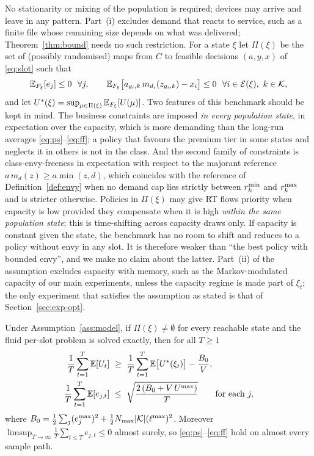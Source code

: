 No stationarity or mixing of the population is required; devices may arrive and leave in any pattern.
Part~(i) excludes demand that reacts to service, such as a finite file whose remaining size depends on what was delivered; Theorem~\ref{thm:bound} needs no such restriction.
For a state $\xi$ let $\Pi(\xi)$ be the set of (possibly randomised) maps from $C$ to feasible decisions $(a,y,x)$ of \eqref{eq:slot} such that
\begin{equation}\label{eq:bench}
\mathbb{E}_{F_\xi}[e_j]\le0\ \ \forall j,\qquad
\mathbb{E}_{F_\xi}\big[a_{g_i,k}\,m_{d_i}(z_{g_i,k})-x_i\big]\le0\ \ \forall i\in\mathcal{E}(\xi),\ k\in\mathcal{K},
\end{equation}
and let $U^*(\xi)=\sup_{\mu\in\Pi(\xi)}\mathbb{E}_{F_\xi}[U(\mu)]$.
Two features of this benchmark should be kept in mind.
The business constraints are imposed \emph{in every population state}, in expectation over the capacity, which is more demanding than the long-run averages \eqref{eq:ps}--\eqref{eq:ff}; a policy that favours the premium tier in some states and neglects it in others is not in the class.
And the second family of constraints is class-envy-freeness in expectation with respect to the majorant reference $a\,m_d(z)\ge a\min(z,d)$, which coincides with the reference of Definition~\ref{def:envy} when no demand cap lies strictly between $r^{\min}_k$ and $r^{\max}_k$ and is stricter otherwise.
Policies in $\Pi(\xi)$ may give RT flows priority when capacity is low provided they compensate when it is high \emph{within the same population state}; this is time-shifting across capacity draws only. If capacity is constant given the state, the benchmark has no room to shift and reduces to a policy without envy in any slot. It is therefore weaker than ``the best policy with bounded envy'', and we make no claim about the latter.
Part~(ii) of the assumption excludes capacity with memory, such as the Markov-modulated capacity of our main experiments, unless the capacity regime is made part of $\xi_t$; the only experiment that satisfies the assumption as stated is that of Section~\ref{sec:exp-opt}.

\begin{theorem}\label{thm:opt}
Under Assumption~\ref{ass:model}, if $\Pi(\xi)\neq\emptyset$ for every reachable state and the fluid per-slot problem is solved exactly, then for all $T\ge1$
\begin{align*}
\frac1T\sum_{t=1}^{T}\E[U_t]\ &\ge\ \frac1T\sum_{t=1}^{T}\E\big[U^*(\xi_t)\big]-\frac{B_0}{V},\\
\frac1T\sum_{t=1}^{T}\E[e_{j,t}]\ &\le\ \sqrt{\frac{2\,(B_0+V\,U^{\max})}{T}}\qquad\text{for each }j,
\end{align*}
where $B_0=\tfrac12\sum_j(e_j^{\max})^2+\tfrac12N_{\max}|\mathcal{K}|(\ell^{\max})^2$.
Moreover $\limsup_{T\to\infty}\frac1T\sum_{t\le T}e_{j,t}\le0$ almost surely, so \eqref{eq:ps}--\eqref{eq:ff} hold on almost every sample path.
\end{theorem}

